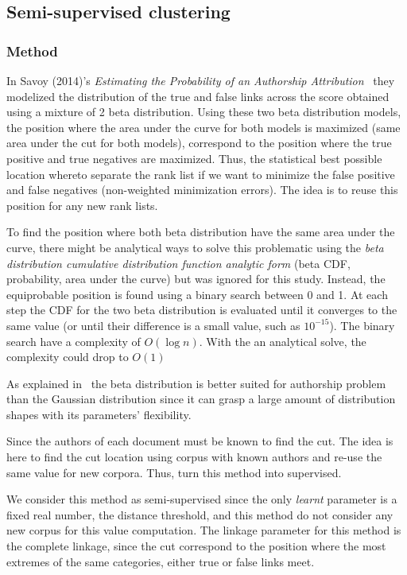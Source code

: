 \subsection{Semi-supervised clustering}

\subsubsection{Method}

In Savoy (2014)'s \textit{Estimating the Probability of an Authorship Attribution}~\cite{savoy_probability} they modelized the distribution of the true and false links across the score obtained using a mixture of 2 beta distribution.
Using these two beta distribution models, the position where the area under the curve for both models is maximized (same area under the cut for both models), correspond to the position where the true positive and true negatives are maximized.
Thus, the statistical best possible location whereto separate the rank list if we want to minimize the false positive and false negatives (non-weighted minimization errors).
The idea is to reuse this position for any new rank lists.

To find the position where both beta distribution have the same area under the curve, there might be analytical ways to solve this problematic using the \textit{beta distribution cumulative distribution function analytic form} (beta CDF, probability, area under the curve) but was ignored for this study.
Instead, the equiprobable position is found using a binary search between 0 and 1.
At each step the CDF for the two beta distribution is evaluated until it converges to the same value (or until their difference is a small value, such as $10^{-15}$).
The binary search have a complexity of $O(\log n)$.
With the an analytical solve, the complexity could drop to $O(1)$

As explained in~\cite{savoy_probability} the beta distribution is better suited for authorship problem than the Gaussian distribution since it can grasp a large amount of distribution shapes with its parameters' flexibility.

Since the authors of each document must be known to find the cut.
The idea is here to find the cut location using corpus with known authors and re-use the same value for new corpora.
Thus, turn this method into supervised.

We consider this method as semi-supervised since the only \textit{learnt} parameter is a fixed real number, the distance threshold, and this method do not consider any new corpus for this value computation.
The linkage parameter for this method is the complete linkage, since the cut correspond to the position where the most extremes of the same categories, either true or false links meet.

